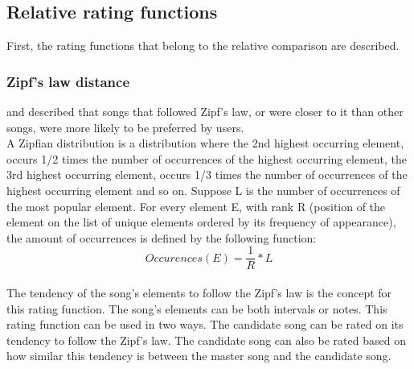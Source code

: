\subsection{Relative rating functions}
First, the rating functions that belong to the relative comparison are described.
\subsubsection{Zipf's law distance}
\cite{Zipfslaw_paper} and \cite{Zipfslaw_paper2} described that songs that followed Zipf's law, or were closer to it than other songs, were more likely to be preferred by users. 
\\
A Zipfian distribution is a distribution where the 2nd highest occurring element, occurs 1/2 times the number of occurrences of the highest occurring element, the 3rd highest occurring element, occurs 1/3 times the number of occurrences of the highest occurring element and so on. Suppose L is the number of occurrences of the most popular element. For every element E, with rank R (position of the element on the list of unique elements ordered by its frequency of appearance), the amount of occurrences is defined by the following function:
\[ Occurences(E) =  \frac{1}{R} * L  \]
\\
The tendency of the song's elements to follow the Zipf's law is the concept for this rating function. The song's elements can be both intervals or notes. This rating function can be used in two ways. The candidate song can be rated on its tendency to follow the Zipf's law. The candidate song can also be rated based on how similar this tendency is between the master song and the candidate song.